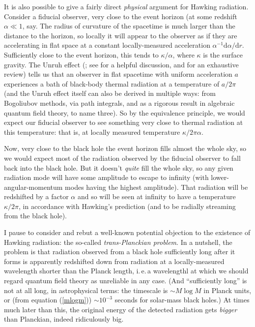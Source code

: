 \documentclass[12pt]{article}
\newcommand{\iec}{\mbox{i.\,e.\,}}
\begin{document}
 It is also possible to give a fairly direct \emph{physical} argument for Hawking radiation. Consider a fiducial observer, very close to the event horizon (at some redshift $\alpha \ll 1$, say. The radius of curvature of the spacetime is much larger than the distance to the horizon, so locally it will appear to the observer as if they are accelerating in flat space at a constant locally-measured acceleration $\alpha^{-1}\mathrm{d}\alpha/\mathrm{d}r$. Sufficiently close to the event horizon, this tends to $\kappa/\alpha$, where $\kappa$ is the surface gravity. 
 The Unruh effect (; see  for a helpful discussion, and  for an exhaustive review) tells us that an observer in flat spacetime with uniform acceleration $a$ experiences a bath of black-body thermal radiation at a temperature of $a/2 \pi$ (and the Unruh effect itself can also be derived in multiple ways: from Bogoliubov methods, via path integrals, and as a rigorous result in algebraic quantum field theory, to name three). So by the equivalence principle, we would expect our fiducial observer to see something very close to thermal radiation at this temperature: that is, at locally measured temperature $\kappa/2\pi \alpha$.
 
 Now, very close to the black hole the event horizon fills almost the whole sky, so we would expect most of the radiation observed by the fiducial observer to fall back into the black hole. But it doesn't \emph{quite} fill the whole sky, so any given radiation mode will have some amplitude to escape to infinity (with lower-angular-momentum modes having the highest amplitude). That radiation will be redshifted by a factor $\alpha$ and so will be seen at infinity to have a temperature $\kappa /2\pi$, in accordance with Hawking's prediction (and to be radially streaming from the black hole).
 
I pause to consider and rebut a well-known potential objection to the existence of Hawking radiation: the so-called \emph{trans-Planckian problem}. In a nutshell, the problem is that radiation observed from a black hole sufficiently long after it forms is apparently redshifted down from radiation at a locally-measured wavelength shorter than the Planck length, \iec a wavelengthl at which we should regard quantum field theory as unreliable in any case.  (And ``sufficiently long'' is not at all long, in astrophysical terms: the timescale is $\sim M \log M$ in Planck units, or (from equation (\ref{mlogm})) $\sim 10^{-3}$ seconds for solar-mass black holes.) At times much later than this, the original energy of the detected radiation gets \emph{bigger} than Planckian, indeed ridiculously big. 
 
\end{document}
